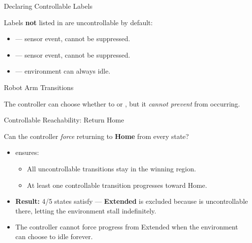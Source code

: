 \begin{frame}[fragile]{Declaring Controllable Labels}



Labels \textbf{not} listed in  are uncontrollable by default:
\begin{itemize}
  \item {} --- sensor event, cannot be suppressed.
  \item {} --- sensor event, cannot be suppressed.
  \item {} --- environment can always idle.
\end{itemize}

\end{frame}

\begin{frame}[fragile]{Robot Arm Transitions}



The controller can choose whether to  or ,
but it \emph{cannot prevent}  from occurring.

\end{frame}

\begin{frame}[fragile]{Controllable Reachability: Return Home}

Can the controller \emph{force} returning to \textbf{Home} from every state?



\medskip
\begin{itemize}
  \item {} ensures:
    \begin{itemize}
      \item All uncontrollable transitions stay in the winning region.
      \item At least one controllable transition progresses toward Home.
    \end{itemize}
  \item \textbf{Result:} 4/5 states satisfy --- \textbf{Extended} is excluded
        because  is uncontrollable there, letting the
        environment stall indefinitely.
  \item The controller cannot force progress from Extended when the
        environment can choose to idle forever.
\end{itemize}

\end{frame}

